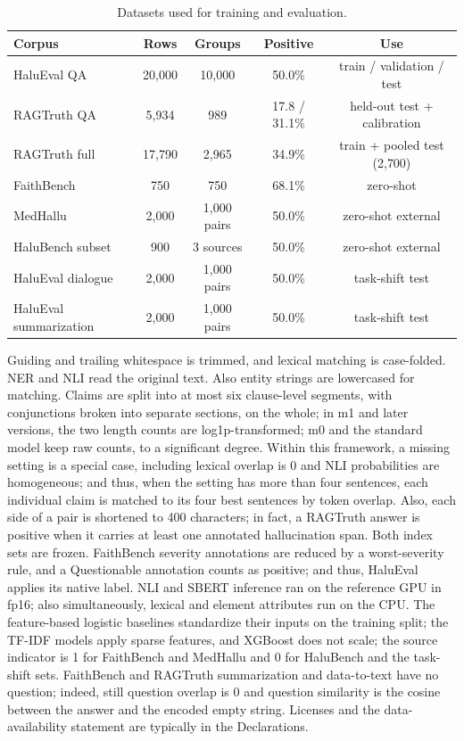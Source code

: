 \documentclass[a4paper,fleqn]{cas-sc}
\begin{document}
\begin{table}[pos=htbp]
  \centering
  \caption{Datasets used for training and evaluation.}
  \label{tab:datasets}
  \begin{tabular}{lcccc}
    \toprule
    \textbf{Corpus} & \textbf{Rows} & \textbf{Groups} & \textbf{Positive} & \textbf{Use}              \\
    \midrule
    HaluEval QA     & 20{,}000      & 10{,}000        & 50.0\%  & train / validation / test \\
    RAGTruth QA     & 5{,}934       & 989             & 17.8 / 31.1\% & held-out test + calibration  \\
    RAGTruth full   & 17{,}790      & 2{,}965         & 34.9\%  & train + pooled test (2{,}700)     \\
    FaithBench      & 750           & 750             & 68.1\%  & zero-shot                 \\
    MedHallu        & 2{,}000       & 1{,}000 pairs   & 50.0\%  & zero-shot external        \\
    HaluBench subset & 900          & 3 sources       & 50.0\%  & zero-shot external        \\
    HaluEval dialogue & 2{,}000     & 1{,}000 pairs   & 50.0\%  & task-shift test           \\
    HaluEval summarization & 2{,}000 & 1{,}000 pairs & 50.0\%  & task-shift test           \\
    \bottomrule
  \end{tabular}
\end{table}

Guiding and trailing whitespace is trimmed, and lexical matching is case-folded. NER and NLI read the original text. Also entity strings are lowercased for matching. Claims are split into at most six clause-level segments, with conjunctions broken into separate sections, on the whole; in m1 and later versions, the two length counts are log1p-transformed; m0 and the standard model keep raw counts, to a significant degree. Within this framework, a missing setting is a special case, including lexical overlap is 0 and NLI probabilities are homogeneous; and thus, when the setting has more than four sentences, each individual claim is matched to its four best sentences by token overlap. Also, each side of a pair is shortened to 400 characters; in fact, a RAGTruth answer is positive when it carries at least one annotated hallucination span. Both index sets are frozen. FaithBench severity annotations are reduced by a worst-severity rule, and a Questionable annotation counts as positive; and thus, HaluEval applies its native label. NLI and SBERT inference ran on the reference GPU in fp16; also simultaneously, lexical and element attributes run on the CPU. The feature-based logistic baselines standardize their inputs on the training split; the TF-IDF models apply sparse features, and XGBoost does not scale; the source indicator is 1 for FaithBench and MedHallu and 0 for HaluBench and the task-shift sets. FaithBench and RAGTruth summarization and data-to-text have no question; indeed, still question overlap is 0 and question similarity is the cosine between the answer and the encoded empty string. Licenses and the data-availability statement are typically in the Declarations.
\end{document}
